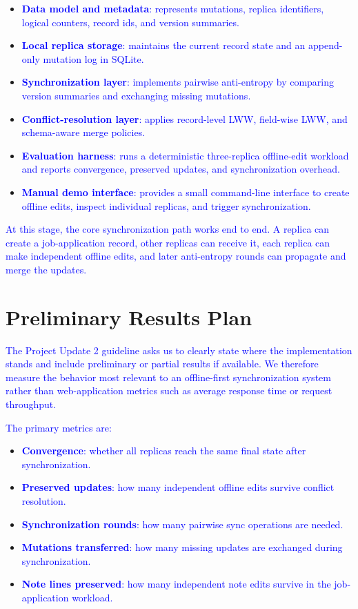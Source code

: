 \documentclass[10pt,twocolumn]{article}
\newcommand{\update}[1]{\textcolor{blue}{#1}}
\begin{document}
\begin{itemize}[leftmargin=*]
    \item \update{\textbf{Data model and metadata}: represents mutations, replica identifiers, logical counters, record ids, and version summaries.}
    \item \update{\textbf{Local replica storage}: maintains the current record state and an append-only mutation log in SQLite.}
    \item \update{\textbf{Synchronization layer}: implements pairwise anti-entropy by comparing version summaries and exchanging missing mutations.}
    \item \update{\textbf{Conflict-resolution layer}: applies record-level LWW, field-wise LWW, and schema-aware merge policies.}
    \item \update{\textbf{Evaluation harness}: runs a deterministic three-replica offline-edit workload and reports convergence, preserved updates, and synchronization overhead.}
    \item \update{\textbf{Manual demo interface}: provides a small command-line interface to create offline edits, inspect individual replicas, and trigger synchronization.}
\end{itemize}

\update{At this stage, the core synchronization path works end to end. A replica can create a job-application record, other replicas can receive it, each replica can make independent offline edits, and later anti-entropy rounds can propagate and merge the updates.}

\section{Preliminary Results Plan}

\update{The Project Update 2 guideline asks us to clearly state where the implementation stands and include preliminary or partial results if available. We therefore measure the behavior most relevant to an offline-first synchronization system rather than web-application metrics such as average response time or request throughput.}

\update{The primary metrics are:}

\begin{itemize}[leftmargin=*]
    \item \update{\textbf{Convergence}: whether all replicas reach the same final state after synchronization.}
    \item \update{\textbf{Preserved updates}: how many independent offline edits survive conflict resolution.}
    \item \update{\textbf{Synchronization rounds}: how many pairwise sync operations are needed.}
    \item \update{\textbf{Mutations transferred}: how many missing updates are exchanged during synchronization.}
    \item \update{\textbf{Note lines preserved}: how many independent note edits survive in the job-application workload.}
\end{itemize}
\end{document}
